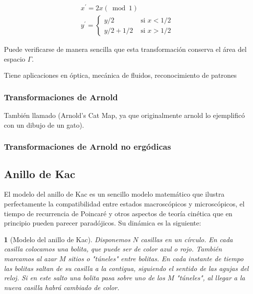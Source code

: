 \documentclass[11pt, a4paper]{article} %
\theoremstyle{named}
\newtheorem*{namedtheorem}{}
\begin{document}
            $$
            \begin{array}{l}
            {x^{\prime}=2 x(\bmod 1)} \\
            {y^{\prime}=\left\{\begin{array}{ll}
            {y / 2} & {\text { si } x<1 / 2} \\
            {y / 2+1 / 2} & {\text { si } x>1 / 2}
            \end{array}\right.}
            \end{array}
            $$

            Puede verificarse de manera sencilla que esta transformación conserva el área del espacio $\Gamma$.

            Tiene aplicaciones en óptica, mecánica de fluidos, reconocimiento de patrones

        \subsubsection{Transformaciones de Arnold}\label{sec:arnold}

            También llamado (Arnold's Cat Map, ya que originalmente arnold lo ejemplificó con un dibujo de un gato).

        \subsubsection{Transformaciones de Arnold no ergódicas}\label{sec:arnold-no-ergo}

    \newpage
    \subsection{Anillo de Kac}\label{sec:ring}

        El modelo del anillo de Kac es un sencillo modelo matemático que ilustra perfectamente la compatibilidad entre estados macroscópicos y microscópicos, el tiempo de recurrencia de Poincaré y otros aspectos de teoría cinética que en principio pueden parecer paradójicos. Su dinámica es la siguiente:

        \begin{namedtheorem}[Modelo del anillo de Kac]
            Disponemos $N$ casillas en un círculo. En cada casilla colocamos una bolita, que puede ser de color azul o rojo. También marcamos al azar $M$ sitios o "túneles" entre bolitas. En cada instante de tiempo las bolitas saltan de su casilla a la contigua, siguiendo el sentido de las agujas del reloj. Si en este salto una bolita pasa sobre uno de los $M$ "túneles", al llegar a la nueva casilla habrá cambiado de color.
        \end{namedtheorem}
\end{document}
